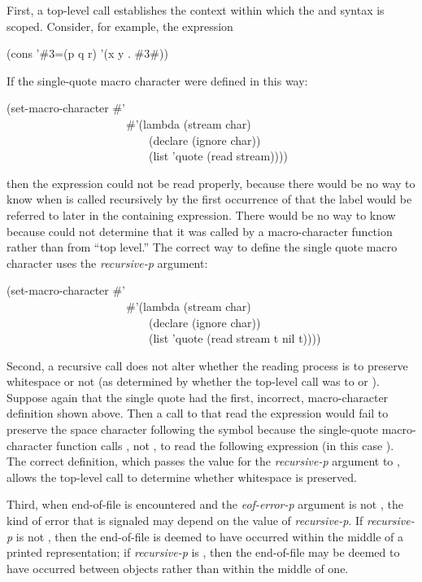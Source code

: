 First, a top-level call establishes the context within which the
 and  syntax is scoped.  Consider, for example,
the expression
\begin{lisp}
(cons '\#3=(p q r) '(x y . \#3\#))
\end{lisp}
If the single-quote macro character were defined in this way:
\begin{lisp}
(set-macro-character \#{\Xbackslash}' \\
~~~~~~~~~~~~~~~~~~~~~\#'(lambda (stream char) \\
~~~~~~~~~~~~~~~~~~~~~~~~~(declare (ignore char)) \\
~~~~~~~~~~~~~~~~~~~~~~~~~(list 'quote (read stream))))
\end{lisp}
then the expression could not be read properly, because there would be no way
to know when  is called recursively by the first
occurrence of  that the label  would be referred to
later in the containing expression.
There would be no way to know because 
could not determine that it was called by a macro-character function
rather than from ``top level.''  The correct way to define the single quote
macro character uses the {\it recursive-p} argument:
\begin{lisp}
(set-macro-character \#{\Xbackslash}' \\
~~~~~~~~~~~~~~~~~~~~~\#'(lambda (stream char) \\
~~~~~~~~~~~~~~~~~~~~~~~~~(declare (ignore char)) \\
~~~~~~~~~~~~~~~~~~~~~~~~~(list 'quote (read stream t nil t))))
\end{lisp}

Second, a recursive call does not alter whether the reading process
is to preserve whitespace or not (as determined by whether the
top-level call was to  or ).
Suppose again that the single quote had the first, incorrect, macro-character
definition shown above.  Then a call to 
that read the expression  would fail to preserve the space
character following the symbol  because the single-quote
macro-character function calls , not ,
to read the following expression (in this case ).
The correct definition, which passes the value {\true} for the {\it recursive-p}
argument to , allows the top-level call to determine
whether whitespace is preserved.

Third, when end-of-file is encountered and the {\it eof-error-p} argument
is not {\nil}, the kind of error that is signaled may depend on the value
of {\it recursive-p}.  If {\it recursive-p} is not {\nil}, then the end-of-file
is deemed to have occurred within the middle of a printed representation;
if {\it recursive-p} is {\nil}, then the end-of-file may be deemed to have
occurred between objects rather than within the middle of one.


